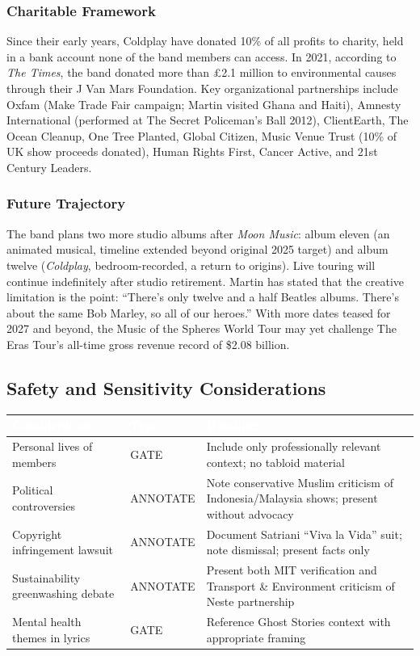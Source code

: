 \documentclass[11pt,letterpaper]{article}
\newcommand{\tableheader}[1]{\textbf{\sffamily\textcolor{white}{#1}}}
\begin{document}
\subsubsection{Charitable Framework}

Since their early years, Coldplay have donated 10\% of all profits to charity, held in a bank account none of the band members can access. In 2021, according to \textit{The Times}, the band donated more than \pounds2.1 million to environmental causes through their J Van Mars Foundation. Key organizational partnerships include Oxfam (Make Trade Fair campaign; Martin visited Ghana and Haiti), Amnesty International (performed at The Secret Policeman's Ball 2012), ClientEarth, The Ocean Cleanup, One Tree Planted, Global Citizen, Music Venue Trust (10\% of UK show proceeds donated), Human Rights First, Cancer Active, and 21st Century Leaders.

\subsubsection{Future Trajectory}

The band plans two more studio albums after \textit{Moon Music}: album eleven (an animated musical, timeline extended beyond original 2025 target) and album twelve (\textit{Coldplay}, bedroom-recorded, a return to origins). Live touring will continue indefinitely after studio retirement. Martin has stated that the creative limitation is the point: ``There's only twelve and a half Beatles albums. There's about the same Bob Marley, so all of our heroes.'' With more dates teased for 2027 and beyond, the Music of the Spheres World Tour may yet challenge The Eras Tour's all-time gross revenue record of \$2.08 billion.

\subsection{Safety and Sensitivity Considerations}

\begin{center}
\begin{tabularx}{\textwidth}{L{4cm}C{2cm}X}
\toprule
{}
\tableheader{Consideration} & \tableheader{Type} & \tableheader{Handling} \\
\midrule
Personal lives of members & GATE & Include only professionally relevant context; no tabloid material \\
Political controversies & ANNOTATE & Note conservative Muslim criticism of Indonesia/Malaysia shows; present without advocacy \\
Copyright infringement lawsuit & ANNOTATE & Document Satriani ``Viva la Vida'' suit; note dismissal; present facts only \\
Sustainability greenwashing debate & ANNOTATE & Present both MIT verification and Transport \& Environment criticism of Neste partnership \\
Mental health themes in lyrics & GATE & Reference Ghost Stories context with appropriate framing \\
\bottomrule
\end{tabularx}
\end{center}
\end{document}
